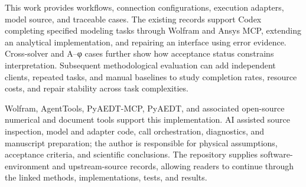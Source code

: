 \hypertarget{auto.06.p4}{}
This work provides workflows, connection configurations, execution adapters, model source, and traceable cases. The existing records support Codex completing specified modeling tasks through Wolfram and Ansys MCP, extending an analytical implementation, and repairing an interface using error evidence. Cross-solver and A–φ cases further show how acceptance status constrains interpretation. Subsequent methodological evaluation can add independent clients, repeated tasks, and manual baselines to study completion rates, resource costs, and repair stability across task complexities.

\hypertarget{auto.06.p5}{}
Wolfram, AgentTools, PyAEDT-MCP, PyAEDT, and associated open-source numerical and document tools support this implementation. AI assisted source inspection, model and adapter code, call orchestration, diagnostics, and manuscript preparation; the author is responsible for physical assumptions, acceptance criteria, and scientific conclusions. The repository supplies software-environment and upstream-source records, allowing readers to continue through the linked methods, implementations, tests, and results.
